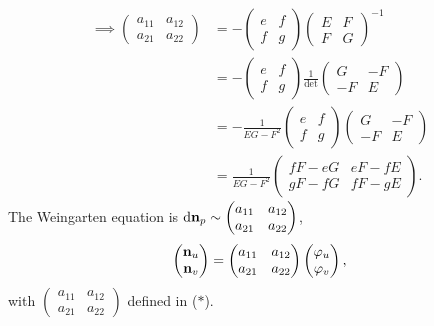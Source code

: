 \begin{align*}
    \implies
    \begin{pmatrix}
        a_{11}&a_{12}\\
        a_{21}&a_{22}
    \end{pmatrix}
    &=-\begin{pmatrix}
        e&f\\
        f&g
    \end{pmatrix}
    \begin{pmatrix}
        E&F\\
        F&G
    \end{pmatrix}^{-1}\\
    &=-\begin{pmatrix}
        e&f\\
        f&g
    \end{pmatrix}
    \frac{1}{\det}\begin{pmatrix}
        G&-F\\
        -F&E
    \end{pmatrix}\\
    &=-\frac{1}{EG-F^2}\begin{pmatrix}
        e&f\\
        f&g
    \end{pmatrix}
    \begin{pmatrix}
        G&-F\\
        -F&E
    \end{pmatrix}\\
    &=\frac{1}{EG-F^2}\begin{pmatrix}
        fF-eG& e F-fE\\
        gF-fG& fF-gE
    \end{pmatrix}\tag{\(\ast \)}.
\end{align*}
The Weingarten equation is \(\dd\vb{n}_p\sim \begin{pmatrix}
    a_{11}&a_{12}\\
    a_{21}&a_{22}
\end{pmatrix}\),
\ie\ 
\[
    \begin{pmatrix}
        \vb{n}_u\\
        \vb{n}_v
    \end{pmatrix}=
    \begin{pmatrix}
        a_{11}&a_{12}\\
        a_{21}&a_{22}
    \end{pmatrix}
    \begin{pmatrix}
        \varphi_u\\
        \varphi_v
    \end{pmatrix},
\]
with \(\begin{pmatrix}
    a_{11}&a_{12}\\
    a_{21}&a_{22}
\end{pmatrix}\) defined in (\(\ast\)).

